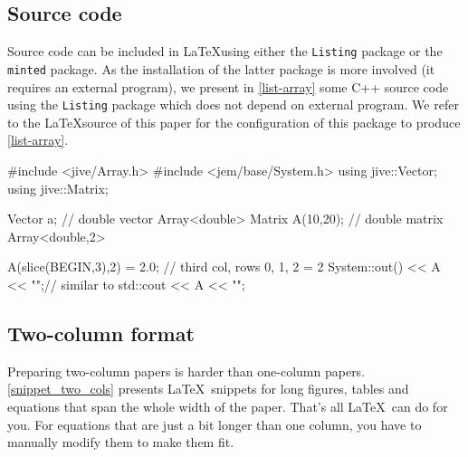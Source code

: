 \documentclass[authoryear,3p,times,preprint,review,fleqn]{elsarticle}
\numberwithin{equation}{section}
\theoremstyle{remark}
\begin{document}
\subsection{Source code}\label{sec:source-code}

Source code can be included in \LaTeX using either the \texttt{Listing} package or the \texttt{minted} package. As the installation of the latter package is more involved (it requires an external program), we present in \cref{list-array} some C++ source code using the \texttt{Listing} package which does not depend on external program. We refer to the \LaTeX source of this paper for the configuration of this package to produce \cref{list-array}.

\begin{code-c-num}[caption={Presentation of source code using the \texttt{Listing} package with the Bera Mono font (\url{https://tug.org/FontCatalogue/beramono/}). },
                   label={list-array},framerule=1pt]
    #include <jive/Array.h>
    #include <jem/base/System.h>
    using jive::Vector;    
    using jive::Matrix;
    
    Vector      a;             // double vector Array<double>
    Matrix      A(10,20);      // double matrix Array<double,2>

    A(slice(BEGIN,3),2) = 2.0; // third col, rows 0, 1, 2 = 2
    System::out() << A << "\n";// similar to std::cout << A << "\n";
\end{code-c-num}

\subsection{Two-column format}\label{sec:two-col}

Preparing two-column papers is harder than one-column papers. \cref{snippet_two_cols} presents \LaTeX\ snippets for long figures, tables and equations that span the whole width of the paper. That's all \LaTeX\ can do for you. For equations that are just a bit longer than one column, you have to manually modify them to make them fit.
\end{document}
